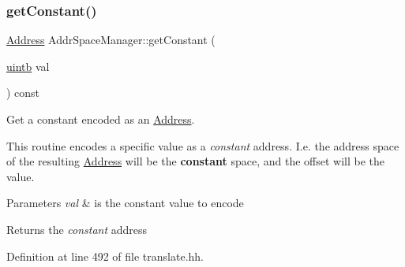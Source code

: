 \subsubsection{\texorpdfstring{getConstant()}{getConstant()}}
{\footnotesize\ttfamily \mbox{\hyperlink{class_address}{Address}} Addr\+Space\+Manager\+::get\+Constant (\begin{DoxyParamCaption}\item[{\mbox{\hyperlink{types_8h_a2db313c5d32a12b01d26ac9b3bca178f}{uintb}}}]{val }\end{DoxyParamCaption}) const\hspace{0.3cm}{\ttfamily [inline]}}



Get a constant encoded as an \mbox{\hyperlink{class_address}{Address}}. 

This routine encodes a specific value as a {\itshape constant} address. I.\+e. the address space of the resulting \mbox{\hyperlink{class_address}{Address}} will be the {\bfseries{constant}} space, and the offset will be the value. 
\begin{DoxyParams}{Parameters}
{\em val} & is the constant value to encode \\
\hline
\end{DoxyParams}
\begin{DoxyReturn}{Returns}
the {\itshape constant} address 
\end{DoxyReturn}


Definition at line 492 of file translate.\+hh.

